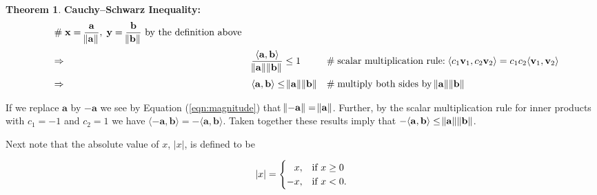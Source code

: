 \documentclass{article}
\theoremstyle{definition}
\newtheorem{theorem}{Theorem}[section]
\begin{document}
\begin{theorem} {\bf Cauchy–Schwarz Inequality:}
\begin{equation*}
\begin{array}{lllll}
					&\mathrel{\#} \text{$\mathbf{x} 
					= \dfrac{\mathbf{a}}{\norm{\mathbf{a}}}, \; \mathbf{y} 
					= \dfrac{\mathbf{b}}{\norm{\mathbf{b}}}$ by the definition above} \\
[12pt]
&\Rightarrow& \dfrac{\langle \mathbf{a},\mathbf{b} \rangle}{\norm{\mathbf{a}} \norm{\mathbf{b}}} \leq 1
					&\mathrel{\#} \text{scalar multiplication rule:
					$\! \langle c_{1}\mathbf{v}_1, c_{2}\mathbf{v}_2 \rangle 
					= c_{1} c_{2} \langle \mathbf{v}_1, \mathbf{v}_2 \rangle$} \\
[12pt]
&\Rightarrow& \langle \mathbf{a},\mathbf{b} \rangle \leq \norm{\mathbf{a}}\norm{\mathbf{b}}
					&\mathrel{\#} \text{multiply both sides by 
					$\norm{\mathbf{a}} \norm{\mathbf{b}}$}

\end{array}
\end{equation*}

\bigskip
\noindent
If we replace $\mathbf{a}$ by $-\mathbf{a}$ we see by Equation
(\ref{eqn:magnitude}) that $\norm{-\mathbf{a}} = \norm{\mathbf{a}}$. 
Further, by the scalar multiplication rule for inner
products with $c_1 = -1$ and $c_2 = 1$ we have $\langle
-\mathbf{a},\mathbf{b} \rangle = - \langle \mathbf{a},\mathbf{b}
\rangle$. Taken together these results imply that $- \langle
\mathbf{a},\mathbf{b} \rangle \leq \norm{\mathbf{a}} 
\norm{\mathbf{b}}$.


\bigskip
\noindent
Next note that the absolute value of $x$, $|x|$,
is defined to be

\bigskip
\begin{equation}
|x| = {
  \begin{cases}\hfill x, & {\text{if }} x \geq 0 \\
                     -x, & {\text{if }} x < 0.
  \end{cases}
}
\label{eqn:absolute_value}
\end{equation}



\end{theorem}
\end{document}
